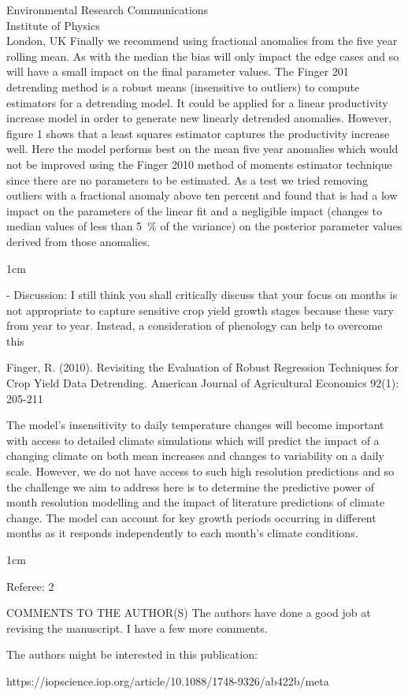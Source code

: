 \documentclass{letter}
\newcommand{\review}[1]{   
    \begin{adjustwidth}{1cm}{}
    \em{#1}
    \end{adjustwidth}
    }
\begin{document}
\begin{letter}{Environmental Research Communications \\ Institute of Physics \\ London, UK}
Finally we recommend using fractional anomalies from the five year rolling mean. As with the median the bias will only impact the edge cases and so will have a small impact on the final parameter values. The Finger 201 detrending method is a robust means (insensitive to outliers) to compute estimators for a detrending model. It could be applied for a linear productivity increase model in order to generate new linearly detrended anomalies. However, figure 1 shows that a least squares estimator captures the productivity increase well. Here the model performs best on the mean five year anomalies which would not be improved using the Finger 2010 method of moments estimator technique since there are no parameters to be estimated. As a test we tried removing outliers with a fractional anomaly above ten percent and found that is had a low impact on the parameters of the linear fit and a negligible impact (changes to median values of less than 5~\% of the variance) on the posterior parameter values derived from those anomalies.


\review{
- Discussion: I still think you shall critically discuss that your focus on months is not appropriate to capture sensitive crop yield growth stages because these vary from year to year. Instead, a consideration of phenology can help to overcome this

Finger, R. (2010). Revisiting the Evaluation of Robust Regression Techniques for Crop Yield Data Detrending. American Journal of Agricultural Economics 92(1): 205-211
}

The model's insensitivity to daily temperature changes will become important with access to detailed climate simulations which will predict the impact of a changing climate on both mean increases and changes to variability on a daily scale. However, we do not have access to such high resolution predictions and so the challenge we aim to address here is to determine the predictive power of month resolution modelling and the impact of literature predictions of climate change. The model can account for key growth periods occurring in different months as it responds independently to each month's climate conditions.

\review{
Referee: 2

COMMENTS TO THE AUTHOR(S)
The authors have done a good job at revising the manuscript. I have a few more comments.

The authors might be interested in this publication: 

https://iopscience.iop.org/article/10.1088/1748-9326/ab422b/meta
}


\end{letter}
\end{document}
